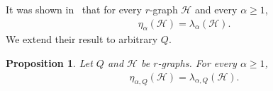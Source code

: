 \documentclass[11pt,a4paper]{article}
\newtheorem{proposition}[definition]{Proposition}
\begin{document}
It was shown in~{\cite[Proposition~5.4]{CY24}} that for every $r$-graph $\mathcal{H}$ and every $\alpha \ge 1$, 
\begin{align*}
    \eta_{\alpha}(\mathcal{H}) = \lambda_{\alpha}(\mathcal{H}).
\end{align*}
%
We extend their result to arbitrary $Q$. 
%
\begin{proposition}\label{PROP:Lagrangian-Entropy}
    Let $Q$ and $\mathcal{H}$ be $r$-graphs. 
    For every $\alpha \ge 1$, 
    \begin{align*}
        \eta_{\alpha, Q}(\mathcal{H}) = \lambda_{\alpha, Q}(\mathcal{H}).
    \end{align*}
\end{proposition}
\end{document}
